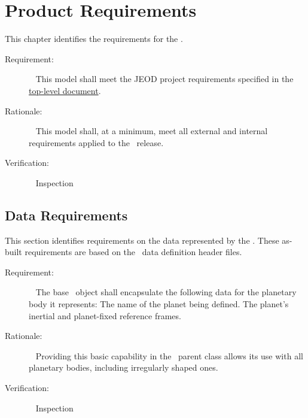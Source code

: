 \chapter{Product Requirements}\label{ch:reqt}

This chapter identifies the requirements for the \planetDesc.

\label{reqt:toplevel}
\begin{description}
\item[Requirement:]\ \newline
  This model shall meet the JEOD project requirements specified in
  the \JEODid\
  \hyperref{file:\JEODHOME/docs/JEOD.pdf}{part1}{reqt}{ top-level
  document}.
\item[Rationale:]\ \newline
  This model shall, at a minimum, meet all external and internal requirements
  applied to the \JEODid\ release.
\item[Verification:]\ \newline
     Inspection
\end{description}

\section{Data Requirements}\label{sec:data_reqts}
This section identifies requirements on the data represented by the \planetDesc.
These as-built requirements are based on the \planetDesc\ data definition header
files.

\label{reqt:base_planet_data_encapsulation}
\begin{description}
  \item[Requirement:]\ \newline
    The base \planetDesc\ object shall encapsulate the following
    data for the planetary body it represents:
    The name of the planet being defined.
    The planet's inertial and planet-fixed reference frames.

  \item[Rationale:]\ \newline
    Providing this basic capability in the \planetDesc\ parent class allows
    its use with all planetary bodies, including irregularly shaped ones.

  \item[Verification:]\ \newline
    Inspection
\end{description}

